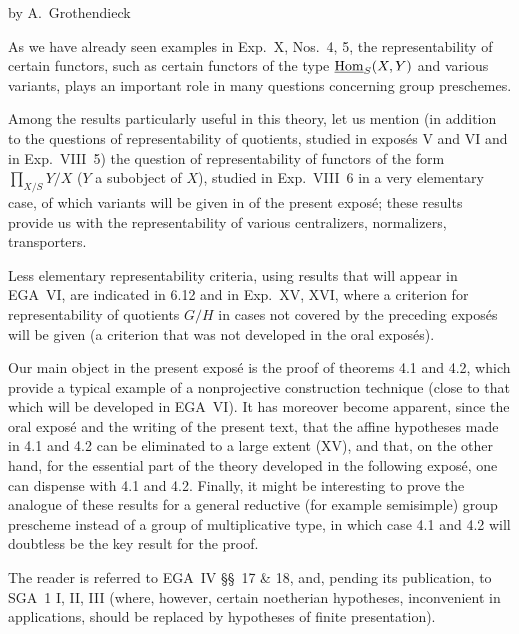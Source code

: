 \label{XI}
\begin{center}by A.~Grothendieck\end{center}
{\renewcommand{\thefootnote}{0}}
\setcounter{footnote}{0}

As we have already seen examples in Exp.~X, Nos.~4, 5, the representability of certain functors, such as certain functors of the type $\underline{\operatorname{Hom}}_S(X,Y)$ and various variants, plays an important role in many questions concerning group preschemes.

Among the results particularly useful in this theory, let us mention (in addition to the questions of representability of quotients, studied in exposés V and VI and in Exp.~VIII~5) the question of representability of functors of the form $\prod_{X/S}Y/X$ ($Y$ a subobject of $X$), studied in Exp.~VIII~6 in a very elementary case, of which variants will be given in  of the present exposé; these results provide us with the representability of various centralizers, normalizers, transporters.

Less elementary representability criteria, using results that will appear in EGA~VI, are indicated in 6.12 and in Exp.~XV, XVI, where a criterion for representability of quotients $G/H$ in cases not covered by the preceding exposés will be given (a criterion that was not developed in the oral exposés).

Our main object in the present exposé is the proof of theorems 4.1 and 4.2, which provide a typical example of a nonprojective construction technique (close to that which will be developed in EGA~VI). It has moreover become apparent, since the oral exposé and the writing of the present text, that the affine hypotheses made in 4.1 and 4.2 can be eliminated to a large extent (\cf XV), and that, on the other hand, for the essential part of the theory developed in the following exposé, one can dispense with 4.1 and 4.2. Finally, it might be interesting to prove the analogue of these results for a general reductive (for example semisimple) group prescheme instead of a group of multiplicative type, in which case 4.1 and 4.2 will doubtless be the key result for the proof.

The reader is referred to EGA~IV §§~17 \& 18, and, pending its publication, to SGA~1 I, II, III (where, however, certain noetherian hypotheses, inconvenient in applications, should be replaced by hypotheses of finite presentation).

